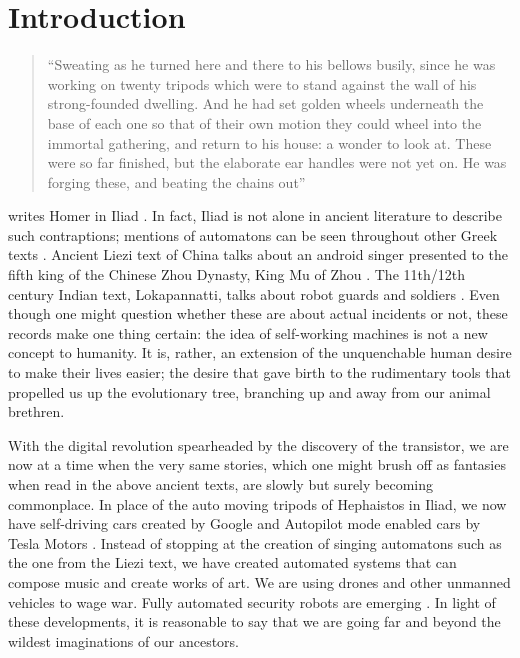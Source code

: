 \section{Introduction}
\label{sec:-intro}
\begin{quotation}\small 
  ``Sweating as he turned here and there to his bellows busily, since he was working on twenty tripods which were to stand against the wall of his strong-founded dwelling. And he had set golden wheels underneath the base of each one so that of their own motion they could wheel into the immortal gathering, and return to his house: a wonder to look at. These were so far finished, but the elaborate ear handles were not yet on. He was forging these, and beating the chains out''
\end{quotation} 
writes Homer in Iliad \cite{homer1194iliad}. In fact, Iliad is not alone in ancient literature to describe such contraptions; mentions of automatons can be seen throughout other Greek texts \cite{aaron2015automatones}.  Ancient Liezi text of China talks about an android singer presented to the fifth king of the Chinese Zhou Dynasty, King Mu of Zhou \cite{lie600liezi}.  The 11th/12th century Indian text, Lokapannatti, talks about robot guards and soldiers \cite{sarah1997lokapannatti}. Even though one might question whether these are about actual incidents or not, these records make one thing certain: the idea of self-working machines is not a new concept to humanity. It is, rather, an extension of the unquenchable human desire to make their lives easier; the desire that gave birth to the rudimentary tools that propelled us up the evolutionary tree, branching up and away from our animal brethren. 

With the digital revolution spearheaded by the discovery of the transistor, we are now at a time when the very same stories, which one might brush off as fantasies when read in the above ancient texts, are slowly but surely becoming commonplace. In place of the auto moving tripods of Hephaistos in Iliad, we now have self-driving cars created by Google \cite{google2016car} and Autopilot mode enabled cars by Tesla Motors \cite{tesla2016car}. Instead of stopping at the creation of singing automatons such as the one from the Liezi text, we have created automated systems that can compose music \cite{liu2014bach} and create works of art\cite{james2016art}. We are using drones and other unmanned vehicles to wage war. Fully automated security robots are emerging \cite{justin2016security}. In light of these developments, it is reasonable to say that we are going far and beyond the wildest imaginations of our ancestors. 

